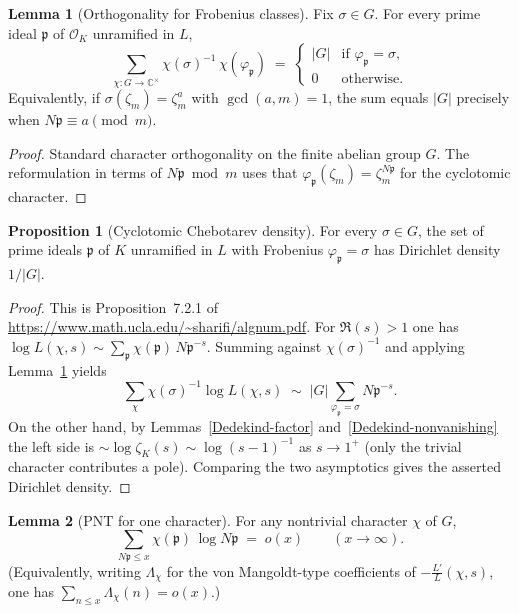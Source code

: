 \documentclass[10pt,a4paper]{article}
\newcommand{\uses}[1]{}
\theoremstyle{definition}
\newtheorem{proposition}{Proposition}[section]
\newtheorem{lemma}{Lemma}[section]
\begin{document}
\begin{lemma}[Orthogonality for Frobenius classes]\label{Chebotarev-orthogonality}
Fix $\sigma \in G$.  For every prime ideal $\mathfrak{p}$ of $\mathcal{O}_K$ unramified in $L$,
\[
\sum_{\chi : G \to \mathbb{C}^\times} \chi(\sigma)^{-1}\,\chi(\varphi_{\mathfrak{p}})
\;=\;
\begin{cases}
|G| & \text{if }\varphi_{\mathfrak{p}} = \sigma,\\
0 & \text{otherwise.}
\end{cases}
\]
Equivalently, if $\sigma(\zeta_m) = \zeta_m^a$ with $\gcd(a,m)=1$, the sum equals $|G|$
precisely when $N\mathfrak{p} \equiv a \pmod{m}$.
\end{lemma}
\begin{proof}
Standard character orthogonality on the finite abelian group $G$.  The reformulation in terms
of $N\mathfrak{p} \bmod m$ uses that $\varphi_{\mathfrak{p}}(\zeta_m) = \zeta_m^{N\mathfrak{p}}$
for the cyclotomic character.
\end{proof}
\begin{proposition}[Cyclotomic Chebotarev density]\label{Chebotarev-cyclotomic-density}
For every $\sigma \in G$, the set of prime ideals $\mathfrak{p}$ of $K$ unramified in $L$ with
Frobenius $\varphi_{\mathfrak{p}} = \sigma$ has Dirichlet density $1/|G|$.
\end{proposition}
\begin{proof}\uses{Dedekind-factor, Dedekind-pole, Dedekind-nonvanishing, Artin-L-euler,
Chebotarev-orthogonality}
This is Proposition~7.2.1 of \url{https://www.math.ucla.edu/~sharifi/algnum.pdf}.  For
$\Re(s)>1$ one has $\log L(\chi,s) \sim \sum_{\mathfrak{p}} \chi(\mathfrak{p})\, N\mathfrak{p}^{-s}$.
Summing against $\chi(\sigma)^{-1}$ and applying Lemma~\ref{Chebotarev-orthogonality} yields
\[
\sum_{\chi} \chi(\sigma)^{-1} \log L(\chi,s)
\;\sim\;
|G| \sum_{\varphi_{\mathfrak{p}}=\sigma} N\mathfrak{p}^{-s}.
\]
On the other hand, by Lemmas~\ref{Dedekind-factor} and~\ref{Dedekind-nonvanishing} the left
side is $\sim \log\zeta_K(s) \sim \log(s-1)^{-1}$ as $s\to 1^+$ (only the trivial character
contributes a pole).  Comparing the two asymptotics gives the asserted Dirichlet density.
\end{proof}
\begin{lemma}[PNT for one character]\label{Dedekind-PNT}
For any nontrivial character $\chi$ of $G$,
\[
\sum_{N\mathfrak{p} \leq x} \chi(\mathfrak{p})\, \log N\mathfrak{p} \;=\; o(x)
\qquad(x\to\infty).
\]
(Equivalently, writing $\Lambda_\chi$ for the von Mangoldt-type coefficients of $-\frac{L'}{L}(\chi,s)$,
one has $\sum_{n\leq x} \Lambda_\chi(n) = o(x)$.)
\end{lemma}
\end{document}
